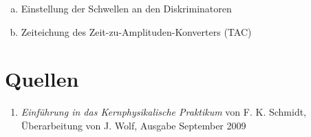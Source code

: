 \documentclass[a4paper,ngerman]{scrartcl}
\begin{document}
\begin{enumerate}[(a)]
\item Einstellung der Schwellen an den Diskriminatoren
\item Zeiteichung des Zeit-zu-Amplituden-Konverters (TAC)
\end{enumerate}



\clearpage
\section{Quellen}
\begin{enumerate}
\item \emph{Einführung in das Kernphysikalische Praktikum} von F. K. Schmidt, 
  Überarbeitung von J. Wolf, Ausgabe September 2009 \label{ref:bb}
\end{enumerate}
\end{document}
